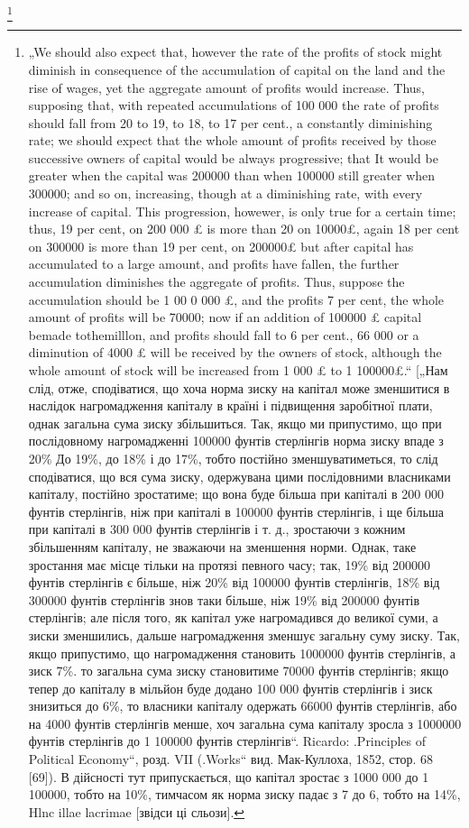 \documentclass[12pt, a4paper, final]{memoir}
\begin{document}
\footnote{„We should also expect that, however the rate of the profits of stock might diminish in consequence of the accumulation of capital on the land and the rise of wages, yet the aggregate amount of profits would increase. Thus, supposing that, with repeated accumulations of 100 000 the rate of profits should fall from 20 to 19, to 18, to 17 per cent., a constantly diminishing rate; we should expect that the whole amount of profits received by those successive owners of capital would be always progressive; that It would be greater when the capital was 200000 than when 100000 still greater when 300000; and so on, increasing, though at a diminishing rate, with every increase of capital. This progression, howewer, is only true for a certain time; thus, 19 per cent, on 200 000 £ is more than 20 on 10000£, again 18 per cent on 300000 is more than 19 per cent, on 200000£ but after capital has accumulated to a large amount, and profits have fallen, the further accumulation diminishes the aggregate of profits. Thus, suppose the accumulation should be 1 00 0 000 £, and the profits 7 per cent, the whole amount of profits will be 70000; now if an addition of 100000 £ capital bemade tothemilllon, and profits should fall to 6 per cent., 66 000 or a diminution of 4000 £ will be received by the owners of stock, although the whole amount of stock will be increased from 1 000 £ to
1 100000£.“ [„Нам слід, отже, сподіватися, що хоча норма зиску на капітал може зменшитися в наслідок нагромадження капіталу в країні і підвищення заробітної плати, однак загальна сума зиску збільшиться. Так, якщо ми припустимо, що при послідовному нагромадженні 100000 фунтів стерлінгів норма зиску впаде з 20\% До 19\%, до 18\% і до 17\%, тобто постійно зменшуватиметься, то слід сподіватися, що вся сума зиску, одержувана цими послідовними власниками капіталу, постійно зростатиме; що вона буде більша при капіталі в 200 000 фунтів стерлінгів, ніж при капіталі в 100000 фунтів стерлінгів, і ще більша при капіталі в 300 000 фунтів стерлінгів і т. д., зростаючи з кожним збільшенням капіталу, не зважаючи на зменшення норми. Однак, таке зростання має місце тільки на протязі певного часу; так, 19\% від 200000 фунтів стерлінгів є більше, ніж 20\% від 100000 фунтів стерлінгів, 18\% від 300000 фунтів стерлінгів знов таки більше, ніж 19\% від 200000 фунтів стерлінгів; але після того, як капітал уже нагромадився до великої суми, а зиски зменшились, дальше нагромадження зменшує загальну суму зиску. Так, якщо припустимо, що нагромадження становить 1000000 фунтів стерлінгів, а зиск 7\%. то загальна сума зиску становитиме 70000 фунтів стерлінгів; якщо тепер до капіталу в мільйон буде додано 100 000 фунтів стерлінгів і зиск знизиться до 6\%, то власники капіталу одержать 66000 фунтів стерлінгів, або на 4000 фунтів стерлінгів менше, хоч загальна сума капіталу зросла з 1000000 фунтів стерлінгів до 1 100000 фунтів стерлінгів“. Ricardo: .Principles of Political Economy“, розд. VII (.Works“ вид. Мак-Куллоха, 1852, стор. 68 [69]). В дійсності тут припускається, що капітал зростає з 1000 000 до 1 100000, тобто на 10\%, тимчасом як норма зиску падає з 7 до 6, тобто на 14\%, Hlnc illae lacrimae [звідси ці сльози].}
\end{document}
